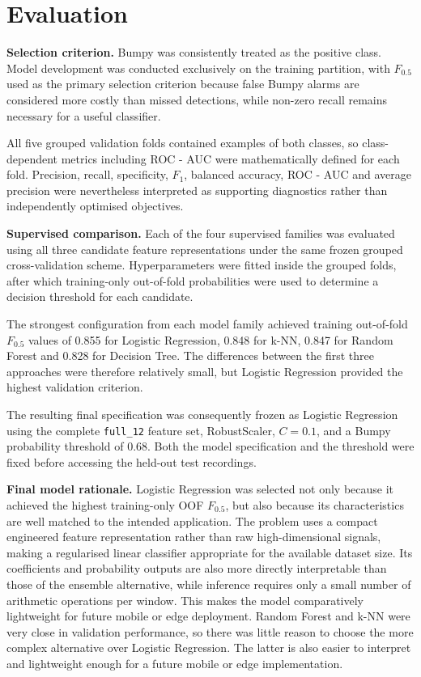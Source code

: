 \section{Evaluation} \label{sec:evaluation}
\textbf{Selection criterion.}
Bumpy was consistently treated as the positive class. Model development was
conducted exclusively on the training partition, with $F_{0.5}$ used as the
primary selection criterion because false Bumpy alarms are considered more
costly than missed detections, while non-zero recall remains necessary for a
useful classifier.

All five grouped validation folds contained examples of both classes, so
class-dependent metrics including ROC - AUC were mathematically defined for
each fold. Precision, recall, specificity, $F_1$, balanced accuracy,
ROC - AUC and average precision were nevertheless interpreted as supporting
diagnostics rather than independently optimised objectives.

\textbf{Supervised comparison.}
Each of the four supervised families was evaluated using all three candidate
feature representations under the same frozen grouped cross-validation
scheme. Hyperparameters were fitted inside the grouped folds, after which
training-only out-of-fold probabilities were used to determine a decision
threshold for each candidate.

The strongest configuration from each model family achieved training
out-of-fold $F_{0.5}$ values of 0.855 for Logistic Regression,
0.848 for k-NN, 0.847 for Random Forest and 0.828 for Decision Tree.
The differences between the first three approaches were therefore relatively
small, but Logistic Regression provided the highest validation criterion.

The resulting final specification was consequently frozen as Logistic
Regression using the complete \texttt{full\_12} feature set, RobustScaler,
$C=0.1$, and a Bumpy probability threshold of $0.68$. Both the model
specification and the threshold were fixed before accessing the held-out test
recordings.

\textbf{Final model rationale.}
Logistic Regression was selected not only because it achieved the highest
training-only OOF $F_{0.5}$, but also because its characteristics are well
matched to the intended application. The problem uses a compact engineered
feature representation rather than raw high-dimensional signals, making a
regularised linear classifier appropriate for the available dataset size.
Its coefficients and probability outputs are also more directly interpretable
than those of the ensemble alternative, while inference requires only a small
number of arithmetic operations per window. This makes the model comparatively
lightweight for future mobile or edge deployment. Random Forest and k-NN were very
close in validation performance, so there was little reason to choose the more complex
alternative over Logistic Regression. The latter is also easier to interpret and lightweight
enough for a future mobile or edge implementation.

